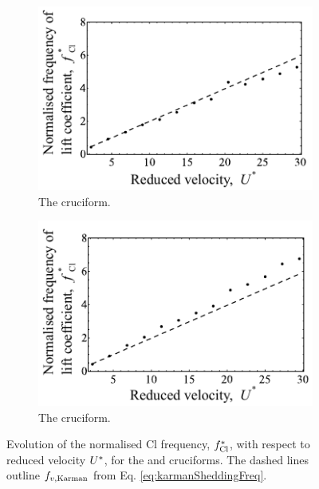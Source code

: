 \documentclass[oneside]{utmthesis}
\begin{document}
\begin{figure}
  \centering
  \begin{subfigure}[h]{0.4\textwidth}
    \includegraphics[width=\textwidth]{figs/clFreq4}
    \caption{The \angfo{} cruciform.}
    \label{fig:clFreq4}
  \end{subfigure}
  \hspace{6mm}
  \begin{subfigure}[h]{0.4\textwidth}
    \includegraphics[width=\textwidth]{figs/clFreq3}
    \caption{The \angth{} cruciform.}
    \label{fig:clFreq3}
  \end{subfigure}

  \label{fig:clFreq43}
  \caption{Evolution of the normalised Cl frequency, $f_{\text{Cl}}^{*}$, with respect to reduced velocity $U^{*}$, for the \angfo{} and \angth{} cruciforms. The dashed lines outline $f_{v,\text{Karman}}$ from Eq. \ref{eq:karmanSheddingFreq}.}
\end{figure}
\end{document}
